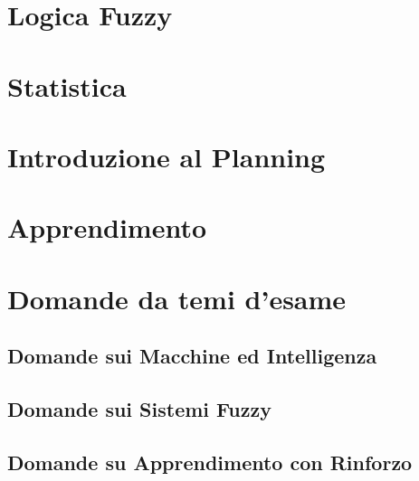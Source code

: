 \providecommand{\main}{.}








{\hypersetup{hidelinks}
  \tableofcontents  %
}

\chapter{Logica Fuzzy}


\chapter{Statistica}


\chapter{Introduzione al Planning}


\chapter{Apprendimento}


\appendix
\chapter{Domande da temi d'esame}

\section{Domande sui Macchine ed Intelligenza}


\section{Domande sui Sistemi Fuzzy}


\section{Domande su Apprendimento con Rinforzo}


